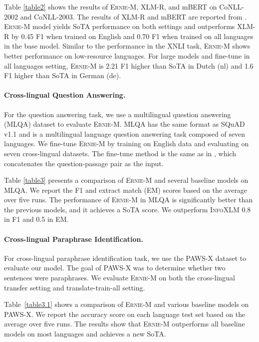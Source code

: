 \documentclass[11pt]{article}
\begin{document}
Table \ref{table2} shows the results of \textsc{Ernie-M}, XLM-R, and mBERT on CoNLL-2002 and CoNLL-2003. The results of XLM-R and mBERT are reported from \citet{conneau2019unsupervised}. \textsc{Ernie-M} model yields SoTA performance on both settings and outperforms XLM-R by 0.45 F1 when trained on English and 0.70 F1 when trained on all languages in the base model. Similar to the performance in the XNLI task, \textsc{Ernie-M} shows better performance on low-resource languages. For large models and fine-tune in all languages setting, \textsc{Ernie-M} is 2.21 F1 higher than SoTA in Dutch (nl) and 1.6 F1 higher than SoTA in German (de).

\paragraph{Cross-lingual Question Answering.} For the question answering task, we use a multilingual question answering (MLQA) dataset to evaluate \textsc{Ernie-M}. MLQA has the same format as SQuAD v1.1 \cite{rajpurkar2016squad} and is a multilingual language question answering task composed of seven languages. We fine-tune \textsc{Ernie-M} by training on English data and evaluating on seven cross-lingual datasets. The fine-tune method is the same as in \citet{lewis2019mlqa}, which concatenates the question-passage pair as the input.

Table \ref{table3} presents a comparison of \textsc{Ernie-M} and several baseline models on MLQA. We report the F1 and extract match (EM) scores based on the average over five runs. The performance of \textsc{Ernie-M} in MLQA is significantly better than the previous models, and it achieves a SoTA score. We outperform \textsc{InfoXLM} 0.8 in F1 and 0.5 in EM.

\paragraph{Cross-lingual Paraphrase Identification.} For cross-lingual paraphrase identification task, we use the PAWS-X \cite{hu2020xtreme} dataset to evaluate our model. The goal of PAWS-X was to determine whether two sentences were paraphrases. We evaluate \textsc{Ernie-M} on both the cross-lingual transfer setting and translate-train-all setting.

Table~\ref{table3.1} shows a comparison of \textsc{Ernie-M} and various baseline models on PAWS-X. We report the accuracy score on each language test set based on the average over five runs. The results show that \textsc{Ernie-M} outperforms all baseline models on most languages and achieves a new SoTA. 
\end{document}
